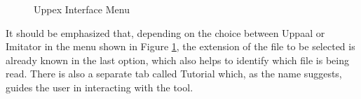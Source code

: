 \begin{figure}[H]
    \centering
    \begin{minipage}{0.78\textwidth}
        \centering
        \caption{Uppex Interface Menu}
        \label{fig:UI}
    \end{minipage}
\end{figure}

It should be emphasized that, depending on the choice between Uppaal or Imitator in the menu shown in Figure \ref{fig:UI}, the extension of the file to be selected is already known in the last option, which also helps to identify which file is being read. There is also a separate tab called Tutorial which, as the name suggests, guides the user in interacting with the tool.



